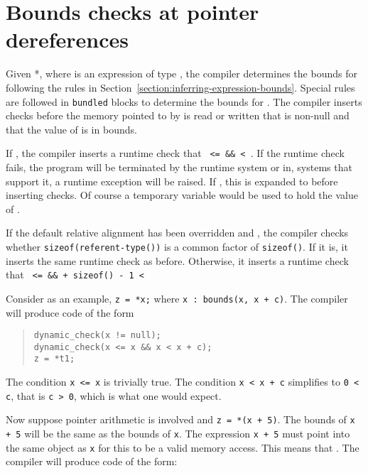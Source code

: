 \section{Bounds checks at pointer dereferences}
\label{section:bounds-checking-indirections}

Given *, where  is an expression of type
\arrayptr, the compiler determines the bounds for 
following the rules in Section~\ref{section:inferring-expression-bounds}.
Special rules are followed in
\texttt{bundled} blocks to determine the bounds for . The
compiler inserts checks before the memory pointed to by  is
read or written that  is non-null and that the value of
 is in bounds.

If ,
the compiler inserts a runtime check that \texttt{ <=  \&\&
 < }. If the runtime check fails, the program
will be terminated by the runtime system or in, systems that support it,
a runtime exception will be raised.   If ,
this is expanded to 
before inserting checks.  Of course a temporary variable would be used to hold the
value of .

If the default relative alignment has been overridden and
, the compiler checks whether
\texttt{sizeof(referent-type())} is a common factor of \texttt{sizeof()}. 
If it is, it inserts the same
runtime check as before. Otherwise, it inserts a runtime check that
\texttt{ <=  \&\&  + sizeof() - 1 < }

Consider as an example, \verb|z = *x;| where 
\verb|x : bounds(x, x + c)|. The compiler will produce code of the form

\begin{quote}
\begin{verbatim}
dynamic_check(x != null);
dynamic_check(x <= x && x < x + c);
z = *t1;
\end{verbatim}
\end{quote}
The condition \texttt{x <= x} is trivially true. The
condition \texttt{x < x + c} simplifies to \texttt{0
< c}, that is \texttt{c > 0}, which is what one
would expect.

Now suppose pointer arithmetic is involved and \texttt{z = *(x + 5)}. The
bounds of \texttt{x + 5} will be the same as the bounds of \texttt{x}.
The expression \texttt{x + 5} must point into the same object as
\texttt{x} for this to be a valid memory access. This means that
.
The compiler will produce code of the form:

